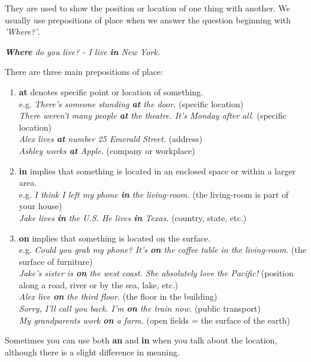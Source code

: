 \documentclass[hidelinks,10pt,a4paper]{article}
\begin{document}
They are used to show the position or location of one thing with another. We usually use prepositions of place when we answer the question beginning with \textit{'Where?'}.

\begin{center}
	\textit{\textbf{Where} do you live? - I live \textbf{in} New York.}
\end{center}

There are three main prepositions of place:
\begin{enumerate}[label=(\alph*)]
	\item \textbf{at} denotes specific point or location of something. \\
		e.g. \textit{There's someone standing \textbf{at} the door.} (specific location)\\
		\textit{There weren't many people \textbf{at} the theatre. It's Monday after all.} (specific location)\\
		\textit{Alex lives \textbf{at} number 25 Emerald Street.} (address)\\
		\textit{Ashley works \textbf{at} Apple.} (company or workplace)
	\item \textbf{in} implies that something is located in an enclosed space or within a larger area.\\
		e.g. \textit{I think I left my phone \textbf{in} the living-room.} (the living-room is part of your house)\\
		\textit{Jake lives \textbf{in} the U.S. He lives \textbf{in} Texas.} (country, state, etc.) \\
	\item \textbf{on} implies that something is located on the surface. \\
		e.g. \textit{Could you grab my phone? It's \textbf{on} the coffee table in the living-room.} (the surface of furniture)\\
		\textit{Jake's sister is \textbf{on} the west coast. She absolutely love the Pacific!} (position along a road, river or by the sea, lake, etc.) \\
		\textit{Alex live \textbf{on} the third floor. } (the floor in the building) \\
		\textit{Sorry, I'll call you back. I'm \textbf{on} the train now.} (public transport) \\
		\textit{My grandparents work \textbf{on} a farm.} (open fields = the surface of the earth)
\end{enumerate}

Sometimes you can use both \textbf{an} and \textbf{in} when you talk about the location, although there is a slight difference in meaning.
\end{document}
